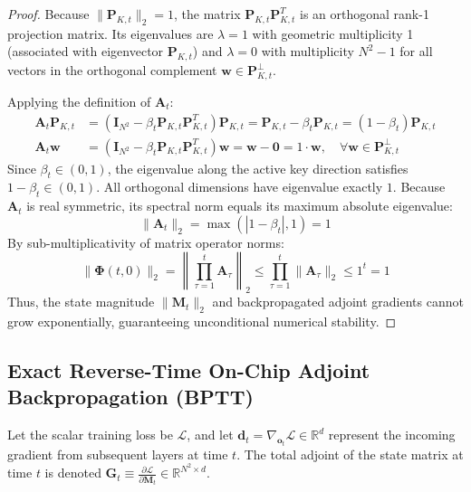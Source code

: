 \documentclass[11pt,a4paper]{article}
\begin{document}
\begin{proof}
Because $\|\mathbf{P}_{K,t}\|_2 = 1$, the matrix $\mathbf{P}_{K,t} \mathbf{P}_{K,t}^T$ is an orthogonal rank-1 projection matrix. Its eigenvalues are $\lambda = 1$ with geometric multiplicity 1 (associated with eigenvector $\mathbf{P}_{K,t}$) and $\lambda = 0$ with multiplicity $N^2 - 1$ for all vectors in the orthogonal complement $\mathbf{w} \in \mathbf{P}_{K,t}^\perp$.

Applying the definition of $\mathbf{A}_t$:
\begin{align}
    \mathbf{A}_t \mathbf{P}_{K,t} &= (\mathbf{I}_{N^2} - \beta_t \mathbf{P}_{K,t} \mathbf{P}_{K,t}^T) \mathbf{P}_{K,t} = \mathbf{P}_{K,t} - \beta_t \mathbf{P}_{K,t} = (1 - \beta_t) \mathbf{P}_{K,t} \\
    \mathbf{A}_t \mathbf{w} &= (\mathbf{I}_{N^2} - \beta_t \mathbf{P}_{K,t} \mathbf{P}_{K,t}^T) \mathbf{w} = \mathbf{w} - \mathbf{0} = 1 \cdot \mathbf{w}, \quad \forall \mathbf{w} \in \mathbf{P}_{K,t}^\perp
\end{align}
Since $\beta_t \in (0, 1)$, the eigenvalue along the active key direction satisfies $1 - \beta_t \in (0, 1)$. All orthogonal dimensions have eigenvalue exactly $1$. Because $\mathbf{A}_t$ is real symmetric, its spectral norm equals its maximum absolute eigenvalue:
\begin{equation}
    \|\mathbf{A}_t\|_2 = \max(|1 - \beta_t|, 1) = 1
\end{equation}
By sub-multiplicativity of matrix operator norms:
\begin{equation}
    \|\mathbf{\Phi}(t, 0)\|_2 = \left\| \prod_{\tau=1}^t \mathbf{A}_\tau \right\|_2 \le \prod_{\tau=1}^t \|\mathbf{A}_\tau\|_2 \le 1^t = 1
\end{equation}
Thus, the state magnitude $\|\mathbf{M}_t\|_2$ and backpropagated adjoint gradients cannot grow exponentially, guaranteeing unconditional numerical stability.
\end{proof}

\subsection{Exact Reverse-Time On-Chip Adjoint Backpropagation (BPTT)}
Let the scalar training loss be $\mathcal{L}$, and let $\mathbf{d}_t = \nabla_{\mathbf{o}_t} \mathcal{L} \in \mathbb{R}^d$ represent the incoming gradient from subsequent layers at time $t$. The total adjoint of the state matrix at time $t$ is denoted $\mathbf{G}_t \equiv \frac{\partial \mathcal{L}}{\partial \mathbf{M}_t} \in \mathbb{R}^{N^2 \times d}$.
\end{document}
